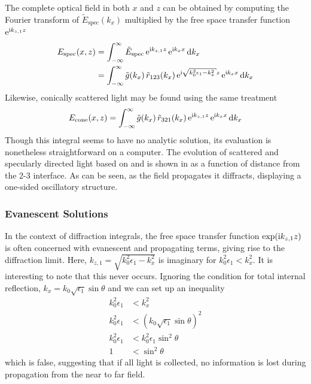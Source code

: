 \documentclass[a4paper,titlepage,onecolumn]{report}
\begin{document}
The complete optical field in both $x$ and $z$ can be obtained by computing
the Fourier transform of $\tilde{E}_\text{spec}(k_x)$ multiplied 
by the free space transfer function ${\mathrm{e}}^{{\mathrm{i}} k_{z,1} z}$
\begin{align}
E_\text{spec}(x,z) &= \intinfty \tilde{E}_\text{spec}\, \me^{\mi k_{z,1} z}\, \me^{\mi k_x x} \md k_x\\
 &= \intinfty \tilde{g}(k_x)\, \tilde{r}_{123}(k_x)\, \me^{\mi \sqrt{k_0^2 \epsilon_1 - k_x^2}z}\, \me^{\mi k_x x} \md k_x
\label{eqn:fourier123}
\end{align}
Likewise, conically scattered light may be found using the same treatment
\begin{align}
E_\text{cone}(x,z) = \int_{-\infty}^{\infty} \tilde{g}(k_x)\, \tilde{r}_{321}(k_x)\,{\mathrm{e}}^{{\mathrm{i}} k_{z,1} z}\, {\mathrm{e}}^{{\mathrm{i}} k_x x} \,\mathrm{d} k_x
\label{eqn:fourier321}
\end{align}
Though this integral seems to have no analytic solution, its evaluation is
nonetheless straightforward on a computer.
The evolution of scattered and specularly directed light based on
 and  is shown in
 as a function of distance from the 2-3
interface.  As can be seen, as the field propagates it diffracts,
displaying a one-sided oscillatory structure. 

\subsubsection{Evanescent Solutions}
In the context of diffraction integrals, the free space transfer function
$\exp({\mathrm{i}} k_{z,1} z)$ is often concerned with evanescent and propagating
terms, giving rise to the diffraction limit.  Here,
$k_{z,1}=\sqrt{k_0^2 \epsilon_1 - k_x^2}$ is imaginary for $k_0^2
\epsilon_1 < k_x^2$.  It is interesting to note that this never occurs.
Ignoring the condition for total internal reflection, 
$k_x = k_0 \sqrt{\epsilon_1} \sin \theta$ and we can set up an inequality
\begin{align}
k_0^2 \epsilon_1 &< k_x^2\\
k_0^2 \epsilon_1 &< \left(k_0 \sqrt{\epsilon_1} \sin \theta\right)^2\\
k_0^2 \epsilon_1 &< k_0^2 \epsilon_1 \sin^2 \theta\\
1 &< \sin^2 \theta
\end{align}
which is false, suggesting that if all light is collected, no information is
lost during propagation from the near to far field.
\end{document}

